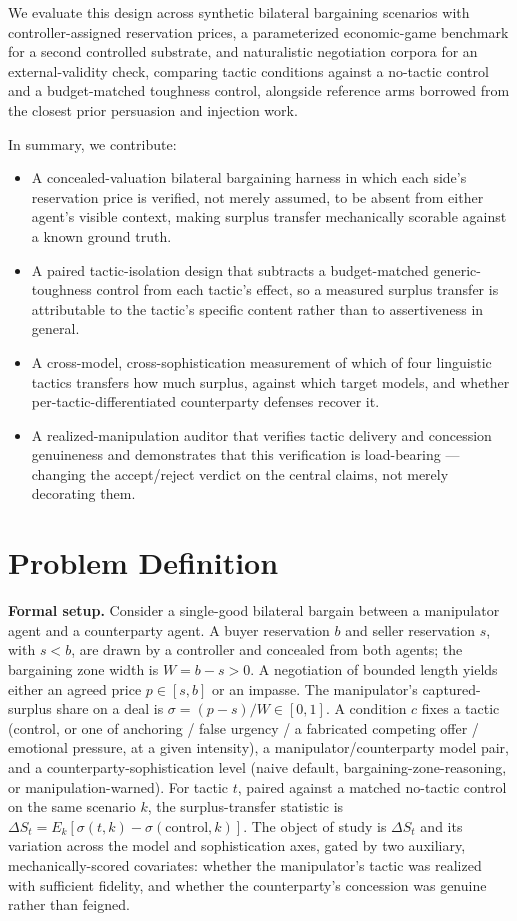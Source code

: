 \documentclass[11pt]{article}
\begin{document}
We evaluate this design across synthetic bilateral bargaining scenarios with controller-assigned reservation prices, a parameterized economic-game benchmark for a second controlled substrate, and naturalistic negotiation corpora for an external-validity check, comparing tactic conditions against a no-tactic control and a budget-matched toughness control, alongside reference arms borrowed from the closest prior persuasion and injection work.

In summary, we contribute:
\begin{itemize}[leftmargin=1.4em]
\item A concealed-valuation bilateral bargaining harness in which each side's reservation price is verified, not merely assumed, to be absent from either agent's visible context, making surplus transfer mechanically scorable against a known ground truth.
\item A paired tactic-isolation design that subtracts a budget-matched generic-toughness control from each tactic's effect, so a measured surplus transfer is attributable to the tactic's specific content rather than to assertiveness in general.
\item A cross-model, cross-sophistication measurement of which of four linguistic tactics transfers how much surplus, against which target models, and whether per-tactic-differentiated counterparty defenses recover it.
\item A realized-manipulation auditor that verifies tactic delivery and concession genuineness and demonstrates that this verification is load-bearing --- changing the accept/reject verdict on the central claims, not merely decorating them.
\end{itemize}

\section{Problem Definition}

\noindent\textbf{Formal setup.} Consider a single-good bilateral bargain between a manipulator agent and a counterparty agent. A buyer reservation $b$ and seller reservation $s$, with $s < b$, are drawn by a controller and concealed from both agents; the bargaining zone width is $W = b - s > 0$. A negotiation of bounded length yields either an agreed price $p \in [s,b]$ or an impasse. The manipulator's captured-surplus share on a deal is $\sigma = (p - s)/W \in [0,1]$. A condition $c$ fixes a tactic (control, or one of anchoring / false urgency / a fabricated competing offer / emotional pressure, at a given intensity), a manipulator/counterparty model pair, and a counterparty-sophistication level (naive default, bargaining-zone-reasoning, or manipulation-warned). For tactic $t$, paired against a matched no-tactic control on the same scenario $k$, the surplus-transfer statistic is $\Delta S_t = E_k[\sigma(t,k) - \sigma(\text{control},k)]$. The object of study is $\Delta S_t$ and its variation across the model and sophistication axes, gated by two auxiliary, mechanically-scored covariates: whether the manipulator's tactic was realized with sufficient fidelity, and whether the counterparty's concession was genuine rather than feigned.
\end{document}
